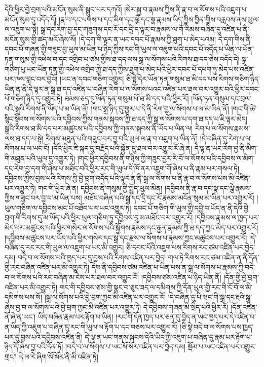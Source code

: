 དེའི་ཕྱིར་བྱེ་བྲག་པའི་མངོན་སུམ་ནི་སྒྲུབ་པར་དཀའོ། །སེར་སྐྱ་བ་རྣམས་ཀྱིས་ནི་རྣ་བ་ལ་སོགས་པའི་འཇུག་པ་མངོན་སུམ་དུ་འདོད་དོ། །རྣ་བ་དང་པགས་པ་དང་མིག་དང་ལྕེ་དང་སྣ་རྣམས་ཡིད་ཀྱིས་བྱིན་གྱིས་བརླབས་ནས་ཡུལ་ལ་འཇུག་པ་སྟེ། སྒྲ་དང་རེག་བྱ་དང་གཟུགས་དང་རོ་དང་དྲི་ད་ལྟར་བ་རྣམས་ལ་གོ་རིམས་བཞིན་དུ་འཛིན་པ་ནི་མངོན་སུམ་གྱི་ཚད་མའོ་ཞེས་སོ། །དེ་དག་གི་ལྟར་ན་ཡང་དབང་པོ་རྣམས་ཀྱི་ཐུག་པ་མེད་པའམ། དེ་དག་གིས་ནི་དབང་པོ་གཞན་གྱི་གཟུང་བྱ་ཡུལ་མ་ཡིན་པ་ཉིད་ཀྱིས་རང་གི་ཡུལ་ལ་འཇུག་པའི་དབང་པོ་འདོད་པ་ཡིན་ལ་ཡོན་ཏན་གསུམ་གྱི་འཕེལ་བ་དང་འགྲིབ་པ་ཙམ་གྱིས་ཐ་དད་ལས་སྒྲ་ལ་སོགས་པའི་རིགས་ཐ་དད་ཅེས་འདོད་དེ། སྒྲ་གཅིག་པུ་ཡང་ཡོན་ཏན་གྱི་འཕེལ་འགྲིབ་ཀྱི་ཐ་དད་ཀྱིས་ཐུག་པ་མེད་པའི་ཕྱིར་དབང་པོ་དཔག་ཏུ་མེད་པས་འཛིན་པར་ཁས་བླང་བར་བྱའོ། །ཡང་ན་དབང་གཅིག་འགྱུར། ཅི་སྟེ་དེར་ཡོན་ཏན་གསུམ་ཐ་མི་དད་པས་རིགས་གཅིག་ཉིད་ཡིན་ན་ནི་དེ་ལྟར་ན་སྒྲ་ཐ་དད་འཛིན་པ་བཞིན་རེག་པ་ལ་སོགས་པའང་འཛིན་པར་ཐལ་བར་འགྱུར་བའི་ཕྱིར་དབང་པོ་གཅིག་ཉིད་དུ་འགྱུར་ཏེ། ཐམས་ཅད་དུ་ཡོན་ཏན་གསུམ་པོ་ཐ་མི་དད་པའི་ཕྱིར་རོ། །ཡོན་ཏན་གསུམ་དང་བྲལ་བའི་སྒྲའི་རིགས་ནི་ཡོད་པ་མ་ཡིན་ནོ། །གང་སྒྲ་ཉིད་དུ་གྱུར་པ་དེ་ནི་རེག་བྱ་ལ་སོགས་པ་ལ་མ་ཡིན་ནོ། །གང་གི་ཚེ་སྙིང་སྟོབས་ལ་སོགས་པའི་དབྱིབས་ཀྱིས་གནས་སྐབས་ཀྱི་ཐ་དད་ཀྱི་སྒྲ་ལ་སོགས་པ་དག་ཐ་དད་པ་ཇི་ལྟར་མེད། སྒྲའི་རིགས་ཐ་མི་དད་པར་མཚུངས་པའི་དབྱིབས་ཀྱི་གནས་སྐབས་ནི་ཡོད་པ་ཡིན་ལ། རེག་པ་ལ་སོགས་རྣམས་ལས་ཐ་དད་པ་སྟེ། རིགས་མཐུན་པའི་གཟུང་བར་བྱ་བའི་ཡུལ་ལ་རྣ་བ་འཇུག་པ་ཡིན་ནོ། །དེ་བཞིན་དུ་རེག་པ་ལ་སོགས་པ་ལ་ཡང་ངོ། །དེའི་ཕྱིར་ཇི་སྐད་དུ་བརྗོད་པའི་སྐྱོན་དུ་ཐལ་བར་འགྱུར་རོ་ཞེ་ན། དེ་ལྟ་ན་ཡང་རེག་བྱ་ནི་མིག་གི་མཐུན་པའི་ཡུལ་དུ་འགྱུར་ཏེ། །གང་ཕྱིར་དབྱིབས་ནི་གཉིས་ཀྱི་གཟུང་བྱར་རི་བོ་ལ་སོགས་པའི་དབྱིབས་ལ་མིག་དང་རེག་བྱ་དག་གི་ཤེས་པ་མཐོང་བའི་ཕྱིར་རང་གི་ཡུལ་དེ་ཁོ་ནར་འཇུག་གོ་ཞེས་པ་ནི་རྣམ་པར་གསལ་ཏེ། དབྱིབས་ཀྱིས་བྱས་པའི་རིགས་ཀྱི་བྱེ་བྲག་འདོད་པའི་ལྟར་ན་ནི་སྒྲ་ལ་སོགས་པ་ནི་རྣ་བ་ལ་སོགས་པས་མི་འཛིན་པར་འགྱུར་ཏེ། གང་གི་ཕྱིར་ཞེ་ན། དབྱིབས་ནི་གསུམ་གྱི་སྤྱོད་ཡུལ་མིན། །དབྱིབས་ནི་རྣ་བ་དང་སྣ་དང་ལྕེ་རྣམས་ཀྱིས་གཟུང་བར་བྱ་བ་མ་ཡིན་པས། མཐོང་བཞིན་པའི་སྒྲ་དང་དྲི་དང་རོ་རྣམས་མངོན་སུམ་མ་ཡིན་པར་འགྱུར་རོ། །ཡུལ་གཅིག་ལ་དབྱིབས་མང་པོ་འཐོབ་པར་ཡང་འགྱུར་ཏེ། དབང་པོ་གཅིག་གི་ཡུལ་གྱི་དབྱེ་བ་ཡོད་ན་ནི་དེའི་བྱེ་བྲག་གི་རིགས་དུ་མ་ཡོད་པའི་ཕྱིར་ཡུལ་གཅིག་ཏུ་དབྱིབས་དུ་མ་མཐོང་བར་འགྱུར་རོ། །དབྱིབས་རྣམས་ལ་ཁྱད་པར་མེད་པར་མཚུངས་པའི་ཕྱིར་གསེར་ལ་སོགས་པའི་སྐྱོགས་རྣམས་དང་རྒྱན་རྣམས་ཀྱི་ཐ་དད་ཀྱང་མེད་པར་འགྱུར་རོ། །དབྱིབས་མཚུངས་པར་ཡོད་པའི་ཕྱིར་གསེར་དང་སྒྲ་དང་རྫས་ལ་སོགས་པ་རྣམས་ཀྱང་མཚུངས་པར་འགྱུར་རོ། །དེ་བཞིན་དུ་རང་རང་གི་ཡུལ་ལ་འཇུག་པ་ཡང་མི་འགྱུར། ཅི་དབང་པོའི་འཇུག་པས་རིགས་རང་ཙམ་འཛིན་པར་བྱེད་དམ། བདེ་བ་ལ་སོགས་པའི་ཁྱད་པར་དུ་བྱས་པའི་རིགས་འཛིན་པར་བྱེད། གལ་ཏེ་རིགས་རང་ཙམ་འཛིན་ན་ནི་དོན་གྱི་རང་བཞིན་འཛིན་པར་མི་འགྱུར་ཏེ། དེས་ནི་དབྱིབས་ཙམ་འཛིན་པ་ཡིན་པས་ན་སྒྲ་ལ་སོགས་པ་རྣམས་ཀྱི་བདེ་བ་ལ་སོགས་པའི་རང་བཞིན་མ་ངེས་པར་ཐལ་བར་འགྱུར་རོ། །དབྱིབས་ཙམ་འཛིན་པ་ཉིད་ཡིན་ནོ། །དོན་གྱི་བྱེ་བྲག་འཛིན་པར་མི་འགྱུར་ཏེ། གང་གི་དབྱིབས་ཙམ་གྱི་སྣང་བ་ཅུང་ཟད་ལ་དམིགས་ཀྱི་དོན་ཡུལ་གྱི་རང་གི་ངོ་བོ་ལ་མི་དམིགས་པས་སོ། །སྒྲ་ལ་སོགས་པའི་བྱེ་བྲག་ཀྱང་མི་འཛིན་པར་འགྱུར་རོ། །དེ་བཞིན་དུ་པི་ཝང་གི་སྒྲ་དང་རྔའི་སྒྲ་ཞེས་བྱ་བ་ལ་སོགས་པའི་བྱེ་བྲག་ཀྱང་མི་འཛིན་པར་འགྱུར་ཏེ། དེ་དབྱིབས་གཞན་མི་སྲིད་པའི་ཕྱིར་རོ། །དོན་འཛིན་ནོ་ཞེ་ན་ཡང་། ཡིད་བཞིན་རྣམ་པར་རྟོག་པ་ཡིན། །རང་གི་དོན་ཁྱད་པར་ཅན་དུ་བྱེད་ན་ཡང་ཁྱད་པར་དེ་འཛིན་པ་ན་ཡིད་ཀྱི་འཇུག་པ་བཞིན་དུ་རང་གི་ཡུལ་ལ་རྟོག་པ་དང་བཅས་པར་འགྱུར་རོ། །ཅི་སྟེ་བདེ་བ་ལ་སོགས་པས་ཁྱད་པར་དུ་བྱས་པའི་དབྱིབས་འཛིན་ནི། དེ་ལྟ་ན་ཡང་གནས་སྐབས་དེའི་ཡིད་ཀྱི་འཇུག་པ་བཞིན་དུ་རྣམ་པར་རྟོག་པ་ཉིད་དོ་ཞེས་བྱ་བའི་དོན་ཏོ། །བདེ་བ་ལ་སོགས་པ་ཡང་སོ་སོར་འཛིན་པར་བྱེད་དམ། སྡོམ་པ་ཡང་འཛིན་པར་འགྱུར་གྲང་། དེ་ལ་རེ་ཞིག་སོ་སོར་ནི་མི་འཛིན་ཏེ། 